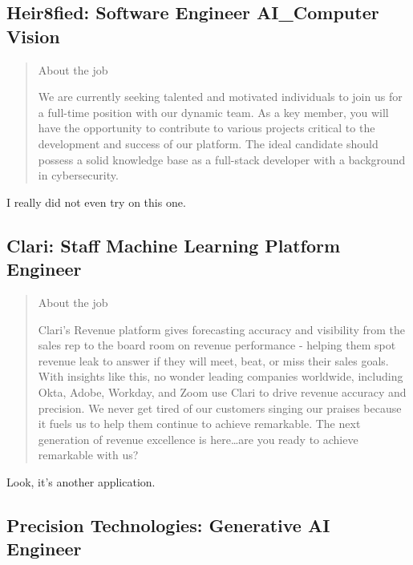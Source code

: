 \documentclass[
	letterpaper, %
	12pt, %
]{CSSullivanBusinessReport}
\begin{document}

\subsection[Heir8fied]{Heir8fied: Software Engineer AI\_Computer Vision}

\begin{quote}
	About the job
	
	We are currently seeking talented and motivated individuals to join us for a full-time position with our dynamic team. As a key member, you will have the opportunity to contribute to various projects critical to the development and success of our platform. The ideal candidate should possess a solid knowledge base as a full-stack developer with a background in cybersecurity.

\end{quote}

I really did not even try on this one.


\subsection[Clari]{Clari: Staff Machine Learning Platform Engineer}

\begin{quote}
	About the job
	
	Clari's Revenue platform gives forecasting accuracy and visibility from the sales rep to the board room on revenue performance - helping them spot revenue leak to answer if they will meet, beat, or miss their sales goals. With insights like this, no wonder leading companies worldwide, including Okta, Adobe, Workday, and Zoom use Clari to drive revenue accuracy and precision. We never get tired of our customers singing our praises because it fuels us to help them continue to achieve remarkable. The next generation of revenue excellence is here…are you ready to achieve remarkable with us? 

\end{quote}

Look, it's another application.



\subsection[Precision Technologies]{Precision Technologies: Generative AI Engineer}
\end{document}
